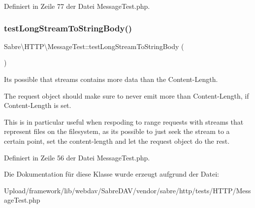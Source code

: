 Definiert in Zeile 77 der Datei Message\+Test.\+php.

\mbox{\label{class_sabre_1_1_h_t_t_p_1_1_message_test_a025843c42b5de7392d30be55f7079283}} 
\subsubsection{\texorpdfstring{test\+Long\+Stream\+To\+String\+Body()}{testLongStreamToStringBody()}}
{\footnotesize\ttfamily Sabre\textbackslash{}\+H\+T\+T\+P\textbackslash{}\+Message\+Test\+::test\+Long\+Stream\+To\+String\+Body (\begin{DoxyParamCaption}{ }\end{DoxyParamCaption})}

It\textquotesingle{}s possible that streams contains more data than the Content-\/\+Length.

The request object should make sure to never emit more than Content-\/\+Length, if Content-\/\+Length is set.

This is in particular useful when respoding to range requests with streams that represent files on the filesystem, as it\textquotesingle{}s possible to just seek the stream to a certain point, set the content-\/length and let the request object do the rest. 

Definiert in Zeile 56 der Datei Message\+Test.\+php.



Die Dokumentation für diese Klasse wurde erzeugt aufgrund der Datei\+:\begin{DoxyCompactItemize}
\item 
Upload/framework/lib/webdav/\+Sabre\+D\+A\+V/vendor/sabre/http/tests/\+H\+T\+T\+P/Message\+Test.\+php\end{DoxyCompactItemize}
